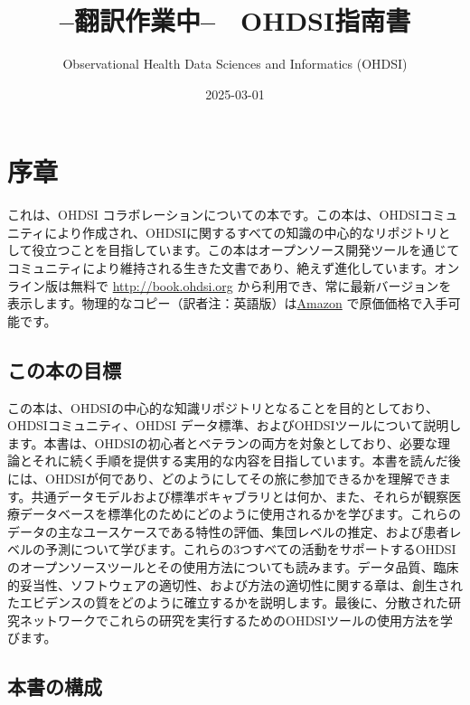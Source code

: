 \documentclass[
  11pt]{book}
\title{--翻訳作業中--　OHDSI指南書}
\author{Observational Health Data Sciences and Informatics (OHDSI)}
\date{2025-03-01}
\theoremstyle{definition}
\theoremstyle{definition}
\theoremstyle{definition}
\theoremstyle{definition}
\theoremstyle{remark}
\begin{document}
\maketitle

{
\setcounter{tocdepth}{1}
\tableofcontents
}
\chapter*{序章}\label{ux5e8fux7ae0}

これは、OHDSI コラボレーションについての本です。この本は、OHDSIコミュニティにより作成され、OHDSIに関するすべての知識の中心的なリポジトリとして役立つことを目指しています。この本はオープンソース開発ツールを通じてコミュニティにより維持される生きた文書であり、絶えず進化しています。オンライン版は無料で \url{http://book.ohdsi.org} から利用でき、常に最新バージョンを表示します。物理的なコピー（訳者注：英語版）は\href{https://www.amazon.com/OHDSI-Observational-Health-Sciences-Informatics/dp/1088855199}{Amazon} で原価価格で入手可能です。

\section*{この本の目標}\label{ux3053ux306eux672cux306eux76eeux6a19}

この本は、OHDSIの中心的な知識リポジトリとなることを目的としており、OHDSIコミュニティ、OHDSI データ標準、およびOHDSIツールについて説明します。本書は、OHDSIの初心者とベテランの両方を対象としており、必要な理論とそれに続く手順を提供する実用的な内容を目指しています。本書を読んだ後には、OHDSIが何であり、どのようにしてその旅に参加できるかを理解できます。共通データモデルおよび標準ボキャブラリとは何か、また、それらが観察医療データベースを標準化のためにどのように使用されるかを学びます。これらのデータの主なユースケースである特性の評価、集団レベルの推定、および患者レベルの予測について学びます。これらの3つすべての活動をサポートするOHDSIのオープンソースツールとその使用方法についても読みます。データ品質、臨床的妥当性、ソフトウェアの適切性、および方法の適切性に関する章は、創生されたエビデンスの質をどのように確立するかを説明します。最後に、分散された研究ネットワークでこれらの研究を実行するためのOHDSIツールの使用方法を学びます。

\section*{本書の構成}\label{ux672cux66f8ux306eux69cbux6210}
\end{document}

